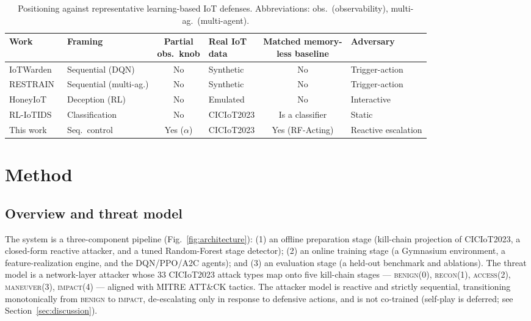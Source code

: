 \documentclass[3p,twocolumn]{elsarticle}
\begin{document}
\begin{table}[tbp]
\centering
\caption{Positioning against representative learning-based IoT defenses.
Abbreviations: obs.\ (observability), multi-ag.\ (multi-agent).}
\label{tab:related}
\footnotesize
\setlength{\tabcolsep}{5pt}
\renewcommand{\arraystretch}{1.2}
\begin{tabular}{@{}l l c l c l@{}}
\toprule
Work & Framing & \makecell{Partial\\obs.\ knob} & \makecell[l]{Real IoT\\data} & \makecell{Matched memory-\\less baseline} & Adversary \\
\midrule
IoTWarden~\cite{Alam2024}   & Sequential (DQN)       & No  & Synthetic  & No                 & Trigger-action \\
RESTRAIN~\cite{Alam2025}    & Sequential (multi-ag.) & No  & Synthetic  & No                 & Trigger-action \\
HoneyIoT~\cite{Guan2023}    & Deception (RL)         & No  & Emulated   & No                 & Interactive \\
RL-IoTIDS~\cite{Odeh2026}   & Classification         & No  & CICIoT2023 & Is a classifier    & Static \\
This work                   & Seq.\ control          & Yes ($\alpha$) & CICIoT2023 & Yes (RF-Acting) & Reactive escalation \\
\bottomrule
\end{tabular}
\end{table}

\section{Method}
\label{sec:method}

\subsection{Overview and threat model}
The system is a three-component pipeline (Fig.~\ref{fig:architecture}):
(1) an offline preparation stage (kill-chain projection of CICIoT2023, a
closed-form reactive attacker, and a tuned Random-Forest stage detector);
(2) an online training stage (a Gymnasium environment, a feature-realization
engine, and the DQN/PPO/A2C agents); and (3) an evaluation stage (a held-out
benchmark and ablations). The threat model is a network-layer attacker whose
$33$ CICIoT2023 attack types map onto five kill-chain stages
--- \textsc{benign}(0), \textsc{recon}(1), \textsc{access}(2),
\textsc{maneuver}(3), \textsc{impact}(4) --- aligned with MITRE ATT\&CK
tactics. The attacker model is reactive and strictly sequential, transitioning
monotonically from \textsc{benign} to \textsc{impact}, de-escalating only in
response to defensive actions, and is not co-trained
(self-play is deferred; see Section~\ref{sec:discussion}).
\end{document}
